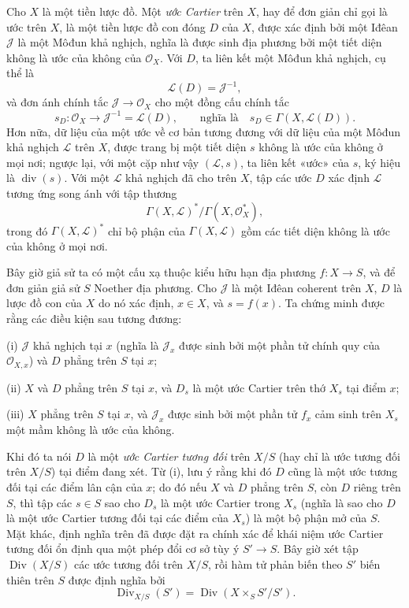 Cho $X$ là một tiền lược đồ. Một \emph{ước Cartier} trên $X$, hay để đơn giản
chỉ gọi là ước trên $X$, là một tiền lược đồ con đóng $D$ của $X$, được xác
định bởi một Iđêan $\mathcal J$ là một Môđun khả nghịch, nghĩa là được sinh địa
phương bởi một tiết diện không là ước của không của $\mathcal O_X$. Với $D$,
ta liên kết một Môđun khả nghịch, cụ thể là
\[
\mathcal L(D)=\mathcal J^{-1},
\]
và đơn ánh chính tắc $\mathcal J\longrightarrow\mathcal O_X$ cho một đồng cấu
chính tắc
\[
s_D:\mathcal O_X\longrightarrow\mathcal J^{-1}=\mathcal L(D),
\qquad\text{nghĩa là}\quad s_D\in\Gamma(X,\mathcal L(D)).
\]
Hơn nữa, dữ liệu của một ước về cơ bản tương đương với dữ liệu của một Môđun
khả nghịch $\mathcal L$ trên $X$, được trang bị một tiết diện $s$ không là ước
của không ở mọi nơi; ngược lại, với một cặp như vậy $(\mathcal L,s)$, ta liên
kết «ước» của $s$, ký hiệu là $\operatorname{div}(s)$. Với một
$\mathcal L$ khả nghịch đã cho trên $X$, tập các
ước $D$ xác định $\mathcal L$ tương ứng song ánh với tập thương
\[
\Gamma(X,\mathcal L)^*/\Gamma(X,\mathcal O_X^*),
\]
trong đó $\Gamma(X,\mathcal L)^*$ chỉ bộ phận của
$\Gamma(X,\mathcal L)$ gồm các tiết diện không là ước của không ở mọi nơi.

Bây giờ giả sử ta có một cấu xạ thuộc kiểu hữu hạn địa phương
$f:X\longrightarrow S$, và để đơn giản giả sử $S$ Noether địa phương. Cho
$\mathcal J$ là một Iđêan coherent trên $X$, $D$ là lược đồ con của $X$ do nó
xác định, $x\in X$, và $s=f(x)$. Ta chứng minh được rằng các điều kiện sau
tương đương:

\noindent (i) $\mathcal J$ khả nghịch tại $x$ (nghĩa là $\mathcal J_x$ được
sinh bởi một phần tử chính quy của $\mathcal O_{X,x}$) và $D$ phẳng trên $S$
tại $x$;

\noindent (ii) $X$ và $D$ phẳng trên $S$ tại $x$, và $D_s$ là một ước Cartier
trên thớ $X_s$ tại điểm $x$;

\noindent (iii) $X$ phẳng trên $S$ tại $x$, và $\mathcal J_x$ được sinh bởi
một phần tử $f_x$ cảm sinh trên $X_s$ một mầm không là ước của không.

Khi đó ta nói $D$ là một \emph{ước Cartier tương đối} trên $X/S$ (hay chỉ là
ước tương đối trên $X/S$) tại điểm đang xét. Từ (i), lưu ý rằng khi đó $D$
cũng là một ước tương đối tại các điểm lân cận của $x$; do đó nếu $X$ và $D$
phẳng trên $S$, còn $D$ riêng trên $S$, thì tập các $s\in S$ sao cho $D_s$ là
một ước Cartier trong $X_s$ (nghĩa là sao cho $D$ là một ước Cartier tương đối
tại các điểm của $X_s$) là một bộ phận mở của $S$. Mặt khác, định nghĩa trên
đã được đặt ra chính xác để khái niệm ước Cartier tương đối ổn định qua một
phép đổi cơ sở tùy ý $S'\longrightarrow S$. Bây giờ xét tập
$\operatorname{Div}(X/S)$ các ước tương đối trên $X/S$, rồi hàm tử phản biến
theo $S'$ biến thiên trên $S$ được định nghĩa bởi
\[
\operatorname{Div}_{X/S}(S')=
\operatorname{Div}(X\times_SS'/S').
\]

